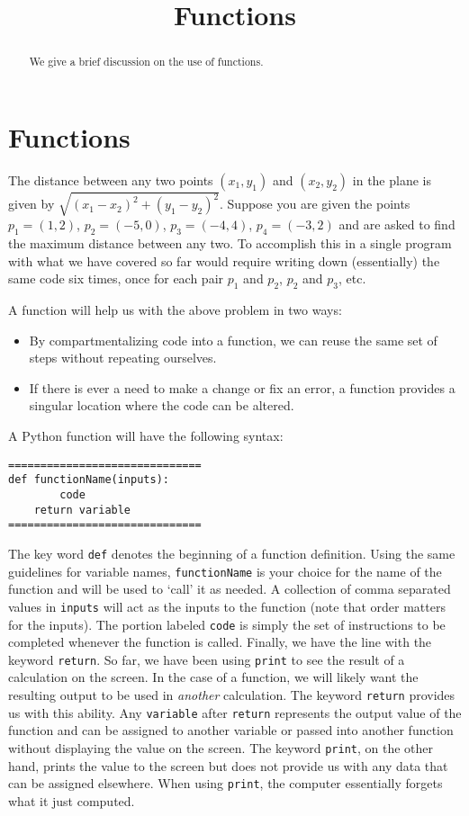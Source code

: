 \documentclass{ximera}
\title{Functions}
\begin{document}
  
\begin{abstract}  
We give a brief discussion on the use of functions.
\end{abstract}  
\maketitle

\section{Functions}

The distance between any two points $(x_1,y_1)$ and $(x_2,y_2)$ in the plane is given by $\sqrt{(x_1-x_2)^2+(y_1-y_2)^2}.$ Suppose you are given the points $p_1=(1,2)$, $p_2=(-5,0)$, $p_3=(-4,4)$, $p_4=(-3,2)$ and are asked to find the maximum distance between any two. To accomplish this in a single program with what we have covered so far would require writing down (essentially) the same code six times, once for each pair $p_1$ and $p_2$, $p_2$ and $p_3$, etc. 

A function will help us with the above problem in two ways:

\begin{itemize}
	\item By compartmentalizing code into a function, we can reuse the same set of steps without repeating ourselves.
	\item If there is ever a need to make a change or fix an error, a function provides a singular location where the code can be altered.
\end{itemize}

A Python function will have the following syntax:

\begin{verbatim}
==============================
def functionName(inputs):
        code
	return variable
==============================
\end{verbatim}

The key word \verb|def| denotes the beginning of a function definition. Using the same guidelines for variable names, \verb|functionName| is your choice for the name of the function and will be used to `call' it as needed. A collection of comma separated values in \verb|inputs| will act as the inputs to the function (note that order matters for the inputs). The portion labeled \verb|code| is simply the set of instructions to be completed whenever the function is called. Finally, we have the line with the keyword \verb|return|. So far, we have been using \verb|print| to see the result of a calculation on the screen. In the case of a function, we will likely want the resulting output to be used in {\em another} calculation. The keyword \verb|return| provides us with this ability. Any \verb|variable| after \verb|return| represents the output value of the function and can be assigned to another variable or passed into another function without displaying the value on the screen. The keyword \verb|print|, on the other hand, prints the value to the screen but does not provide us with any data that can be assigned elsewhere. When using \verb|print|, the computer essentially forgets what it just computed.
\end{document}
